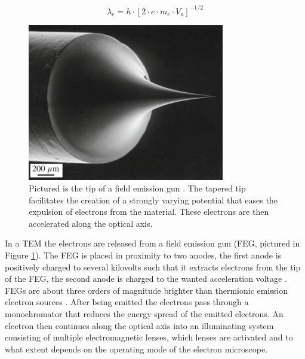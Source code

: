 \begin{equation}
    \lambda_e = h\cdot \left[ 2 \cdot e \cdot m_e \cdot V_a \right]^{-1/2}
    \label{eq:acc_volts}
\end{equation}

\begin{figure}[h]
    \centering
    \includegraphics[keepaspectratio, width=0.5\linewidth]{resources/Figures/feg.png} 
    \caption{Pictured is the tip of a field emission gun \cite{Williams2009-ww}. The tapered tip facilitates the creation of a strongly varying potential that eases the expulsion of electrons from the material. These electrons are then accelerated along the optical axis.}
    \label{fig:feg}
\end{figure}

In a TEM the electrons are released from a field emission gun (FEG, pictured in Figure \ref{fig:feg}). 
The FEG is placed in proximity to two anodes, the first anode is positively charged to several kilovolts such that it extracts electrons from the tip of the FEG, the second anode is charged to the wanted acceleration voltage \cite{Williams2009-ww}.
FEGs are about three orders of magnitude brighter than thermionic emission electron sources \cite{field-emission}.
After being emitted the electrons pass through a monochromator that reduces the energy spread of the emitted electrons. An electron then continues along the optical axis into an illuminating system consisting of multiple electromagnetic lenses, which lenses are activated and to what extent depends on the operating mode of the electron microscope.

